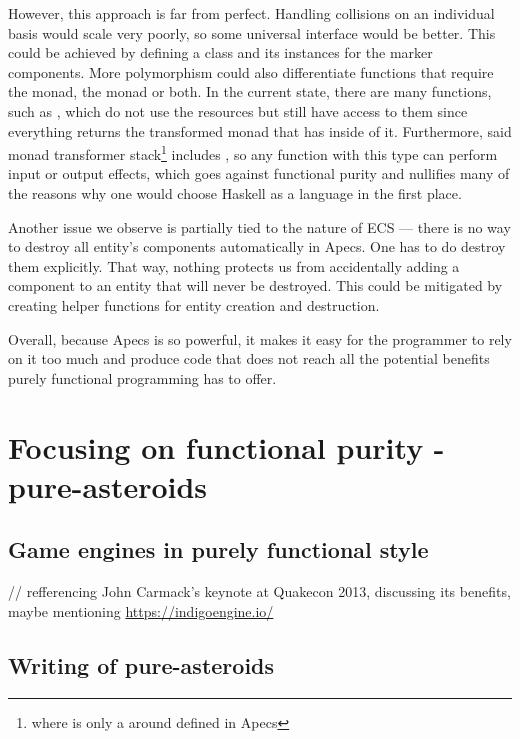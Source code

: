 \documentclass[
  digital, %
  color,   %
  table,   %
  oneside, %
  lof,     %
  lot,     %
]{fithesis3}
\begin{document}
However, this approach is far from perfect. Handling collisions on an
individual basis would scale very poorly, so some universal interface would be better.
This could be achieved by defining a class and its instances for the marker components.
More polymorphism could also differentiate functions that require the
 monad, the  monad or both.
In the current state, there are many functions, such as ,
which do not use the resources but still have access to them since
everything returns the transformed  monad
that has  inside of it. Furthermore,
said monad transformer stack\footnote{
where  is only a 
around  defined in Apecs
}
includes , so any function with this type can perform
input or output effects, which goes against functional purity and nullifies
many of the reasons why one would choose Haskell as a language in the first place.

Another issue we observe is partially tied to the nature of ECS — there
is no way to destroy all entity's components automatically in Apecs.
One has to do destroy them explicitly. That way, nothing protects us
from accidentally adding a component to an entity that will never be destroyed.
This could be mitigated by creating helper functions for entity creation and destruction.

Overall, because Apecs is so powerful, it makes it easy for the programmer to rely
on it too much and produce code that does not reach all the potential
benefits purely functional programming has to offer.



\chapter{Focusing on functional purity - pure-asteroids}

\section{Game engines in purely functional style}
// refferencing John Carmack's keynote at Quakecon 2013,
discussing its benefits, maybe mentioning \url{https://indigoengine.io/}

\section{Writing of pure-asteroids}
\end{document}
